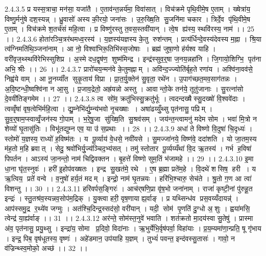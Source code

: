 2.4.3.5
प्र यस्स॒त्राचा॒ मन॑सा॒ यजा॑तै । ए॒ताव॑न्त॒न्नर्य॑मा॒ विवा॑सात् । विच॑क्रमे पृथि॒वीमे॒ष ए॒ताम् । ख्षेत्रा॑य॒ विष्णु॒र्मनु॑षे दश॒स्यन्न् । ध्रु॒वासो॑ अस्य की॒रयो॒ जना॑सः । उ॒रु॒ख्षि॒ति सु॒जनि॑मा चकार । त्रिर्दे॒व पृ॑थि॒वीमे॒ष ए॒ताम् । विच॑क्रमे श॒तर्च॑सं महि॒त्वा । प्र विष्णु॑रस्तु त॒वस॒स्तवी॑यान् । त्वे॒ष ह्य॑स्य॒ स्थवि॑रस्य॒ नाम॑ ।। 25 ।।
2.4.3.6
होता॑रञ्चि॒त्रर॑थमध्व॒रस्य॑ । य॒ज्ञस्य॑यज्ञस्य के॒तु रुश॑न्तम् । प्रत्य॑र्धिन्दे॒वस्य॑देवस्य म॒ह्ना । श्रि॒या त्व॑ग्निमति॑थि॒ञ्जना॑नाम् । आ नो॒ विश्वा॑भिरू॒तिभि॑स्स॒जोषाः । ब्रह्म॑ जुषा॒णो ह॑र्यश्व याहि । वरी॑वृज॒थ्स्थवि॑रेभिस्सुशिप्र । अ॒स्मे दध॒द्वृष॑ण॒॒ शुष्म॑मिन्द्र । इन्द्र॑स्सुव॒र्॒षा ज॒नय॒न्नहा॑नि । जि॒गायो॒शिग्भि॒ पृत॑ना अभि॒ श्रीः ।। 26 ।।
2.4.3.7
प्रारो॑चय॒न्मन॑वे के॒तुमह्नाम् । अवि॑न्द॒ज्ज्योति॑र्बृह॒ते रणा॑य । अश्वि॑ना॒वव॑से॒ निह्व॑ये वाम् । आ नू॒नय्याँ॑त सुकृ॒ताय॑ विप्रा । प्रा॒त॒र्यु॒क्तेन॑ सु॒वृता॒ रथे॑न । उ॒पाग॑च्छत॒मव॒साग॑तन्नः । अ॒वि॒ष्टन्धी॒ष्वश्वि॑ना न आ॒सु । प्र॒जाव॒द्रेतो॒ अह्र॑यन्नो अस्तु । आवान्तो॒के तन॑ये॒ तूतु॑जानाः । सु॒रत्ना॑सो दे॒ववी॑तिङ्गमेम ।। 27 ।।
2.4.3.8
त्व सो॑म॒ क्रतु॑भिस्सु॒क्रतु॑र्भूः । त्वदन्दख्षैस्सु॒दख्षो॑ वि॒श्ववे॑दाः । त्वव्वृँषा॑ वृष॒त्वेभि॑र्महि॒त्वा । द्यु॒म्नेभि॑र्द्यु॒म्न्य॑भवो नृ॒चख्षाः । अषा॑ढय्युँ॒थ्सु पृत॑नासु॒ पप्रिम् । सु॒व॒र्॒षाम॒प्स्वाव्वृँ॒जन॑स्य गो॒पाम् । भ॒रे॒षु॒जा सु॑ख्षि॒ति सु॒श्रव॑सम् । जय॑न्त॒न्त्वामनु॑ मदेम सोम । भवा॑ मि॒त्रो न शेव्यो॑ घृ॒तासु॑तिः । विभू॑तद्युम्न एव॒ या उ॑ स॒प्रथाः ।। 28 ।।
2.4.3.9
अधा॑ ते विष्णो वि॒दुषा॑ चि॒दृध्यः॑ । स्तोमो॑ य॒ज्ञस्य॒ राध्यो॑ ह॒विष्म॑तः । य पू॒र्व्याय॑ वे॒धसे॒ नवी॑यसे । सु॒मज्जा॑नये॒ विष्ण॑वे॒ ददा॑शति । यो जा॒तम॒स्य म॑ह॒तो म॒हि ब्रवात् । सेदु॒ श्रवो॑भिर्यु॒ज्य॑ञ्चिद॒भ्य॑सत् । तमु॑ स्तोतार पू॒र्व्यय्यँथा॑ वि॒द ऋ॒तस्य॑ । गर्भ॑ ह॒विषा॑ पिपर्तन । आऽस्य॑ जा॒नन्तो॒ नाम॑ चिद्विवक्तन । बृ॒हत्ते॑ विष्णो सुम॒तिं भ॑जामहे ।। 29 ।।
2.4.3.10
इ॒मा धा॒ना घृ॑त॒स्नुवः॑ । हरी॑ इ॒होप॑वख्षतः । इन्द्र॑ सु॒खत॑मे॒ रथे । ए॒ष ब्र॒ह्मा प्रते॑म॒हे । वि॒दथे॑ शसिष॒॒ हरी । य ऋ॒त्विय॒ प्रते॑ वन्वे । व॒नुषो॑ हर्य॒तं मदम् । इन्द्रो॒ नाम॑ घृ॒तन्नयः । हरि॑भि॒श्चारु॒ सेच॑ते । श्रु॒तो ग॒ण आ त्वा॑ विशन्तु ।। 30 ।।
2.4.3.11
हरि॑वर्पस॒ङ्गिरः॑ । आच॑र्‌षणि॒प्रा वृ॑ष॒भो जना॑नाम् । राजा॑ कृष्टी॒नां पु॑रुहू॒त इन्द्रः॑ । स्तु॒तश्र॑व॒स्यन्नव॒सोप॑म॒द्रिक् । यु॒क्त्वा हरी॒ वृष॒णायाह्य॒र्वाङ् । प्र यथ्सिन्ध॑व प्रस॒वय्यँदायन्न्॑ । आप॑स्समु॒द्र र॒थ्ये॑व जग्मुः । अत॑श्चि॒दिन्द्र॒स्सद॑सो॒ वरी॑यान् । यदी॒॒ सोम॑ पृ॒णति॑ दु॒ग्धो अ॒॒शुः । ह्वया॑मसि॒ त्वेन्द्र॑ या॒ह्य॑र्वाङ् ।। 31 ।।
2.4.3.12
अर॑न्ते॒ सोम॑स्त॒नुवे॑ भवाति । शत॑क्रतो मा॒दय॑स्वा सु॒तेषु॑ । प्रास्मा अ॑व॒ पृत॑नासु॒ प्रयु॒थ्सु । इन्द्रा॑य॒ सोमा प्र॒दिवो॒ विदा॑नाः । ऋ॒भुर्येभि॒र्वृष॑पर्वा॒ विहा॑याः । प्र॒य॒म्यमा॑णा॒न्प्रति॒ षू गृ॑भाय । इन्द्र॒ पिब॒ वृष॑धूतस्य॒ वृष्णः॑ । अहे॑डमान॒ उप॑याहि य॒ज्ञम् । तुभ्यं॑ पवन्त॒ इन्द॑वस्सु॒तासः॑ । गावो॒ न व॑ज्रिन्थ्स्व॒मोको॒ अच्छ॑ ।। 32 ।।
